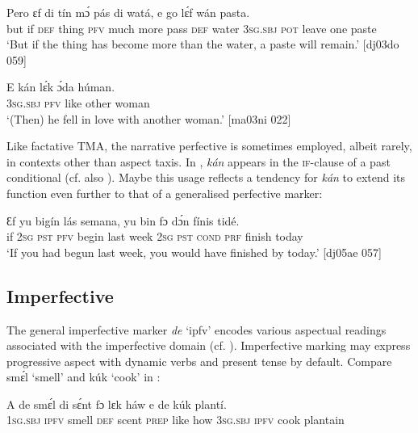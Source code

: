 \ea%
    \label{ex:key:326}
    \gll Pero    ɛf  di  tín       mɔ́    pás  di  watá,
e    go  lɛ́f    wán    pasta.\\
but    if  \textsc{def}  thing  \textsc{pfv}  much  more  pass  \textsc{def}  water
\textsc{3sg.sbj}  \textsc{pot}  leave  one    paste\\

\glt ‘But if the thing has become more than the water, a paste will remain.’ [dj03do 059]
\z


\ea%
    \label{ex:key:327}
    \gll E    kán  lɛ́k  ɔ́da    húman.\\
\textsc{3sg.sbj}  \textsc{pfv}  like  other  woman\\

\glt ‘(Then) he fell in love with another woman.’ [ma03ni 022]
\z

Like factative TMA, the narrative perfective is sometimes employed, albeit rarely, in contexts other than aspect taxis. In , \textit{kán} appears in the \textsc{if-}clause of a past conditional (cf. also ). Maybe this usage reflects a tendency for \textit{kán} to extend its function even further to that of a generalised perfective marker: 


\ea%
    \label{ex:key:328}
    \gll Ɛf  yu     bigín  lás  semana,  yu  bin  fɔ    dɔ́n  fínis    tidé.\\
if  \textsc{2sg}  \textsc{pst}  \textsc{pfv}  begin  last  week  \textsc{2sg}  \textsc{pst}  \textsc{cond}    \textsc{prf}  finish  today\\

\glt ‘If you had begun last week, you would have finished by today.’ [dj05ae 057]
\z

\subsection{Imperfective}\label{sec:6.3.4}

The general imperfective marker \textit{de} ‘ipfv’ encodes various aspectual readings associated with the imperfective domain (cf. ). Imperfective marking may express progressive aspect with dynamic verbs and present tense{\fff} by default. Compare smɛ́l ‘smell’ and kúk ‘cook’ in : 


\ea%
    \label{ex:key:329}
    \gll A    de  smɛ́l  di  sɛ́nt    fɔ  lɛk  háw    e    de  kúk    plantí.\\
\textsc{1sg.sbj}  \textsc{ipfv}  smell  \textsc{def}  scent  \textsc{prep}  like  how    \textsc{3sg.sbj}  \textsc{ipfv}  cook  plantain\\

